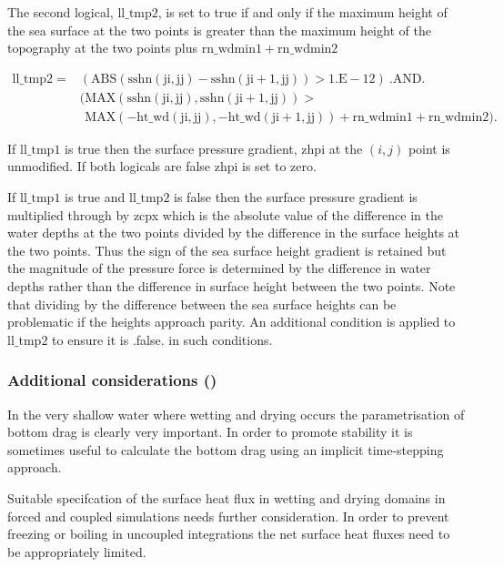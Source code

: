 \documentclass[../main/NEMO_manual]{subfiles}
\begin{document}
The second logical, $\mathrm{ll\_tmp2}$, is set to true if and only if the maximum height
of the sea surface at the two points is greater than the maximum height of the topography
at the two points plus $\mathrm{rn\_wdmin1} + \mathrm{rn\_wdmin2}$

\begin{equation}
  \label{eq:DYN_ll_tmp2}
  \begin{split}
    \mathrm{ ll\_tmp2 } = & \mathrm{( ABS( sshn(ji,jj) - sshn(ji+1,jj) ) > 1.E-12 )\ .AND.}\\
    & \mathrm{( MAX(sshn(ji,jj), sshn(ji+1,jj)) > } \\
    & \mathrm{\phantom{(} MAX(-ht\_wd(ji,jj), -ht\_wd(ji+1,jj)) + rn\_wdmin1 + rn\_wdmin2}) .
  \end{split}
\end{equation}

If $\mathrm{ll\_tmp1}$ is true then the surface pressure gradient, zhpi at the $(i,j)$
point is unmodified. If both logicals are false zhpi is set to zero.

If $\mathrm{ll\_tmp1}$ is true and $\mathrm{ll\_tmp2}$ is false then the surface pressure
gradient is multiplied through by zcpx which is the absolute value of the difference in
the water depths at the two points divided by the difference in the surface heights at the
two points. Thus the sign of the sea surface height gradient is retained but the magnitude
of the pressure force is determined by the difference in water depths rather than the
difference in surface height between the two points. Note that dividing by the difference
between the sea surface heights can be problematic if the heights approach parity. An
additional condition is applied to $\mathrm{ ll\_tmp2 }$ to ensure it is .false. in such
conditions.

\subsubsection[Additional considerations (\textit{usrdef\_zgr.F90})]{Additional considerations ()}
\label{subsec:DYN_WAD_additional}

In the very shallow water where wetting and drying occurs the parametrisation of
bottom drag is clearly very important. In order to promote stability
it is sometimes useful to calculate the bottom drag using an implicit time-stepping approach.

Suitable specifcation of the surface heat flux in wetting and drying domains in forced and
coupled simulations needs further consideration. In order to prevent freezing or boiling
in uncoupled integrations the net surface heat fluxes need to be appropriately limited.
\end{document}
